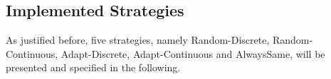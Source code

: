 \documentclass{article}
\begin{document}
%
%

\subsection{Implemented Strategies}

As justified before, five strategies, namely Random-Discrete, Random-Continuous, Adapt-Discrete, Adapt-Continuous and AlwaysSame, will be presented and specified in the following.
	
\end{document}
